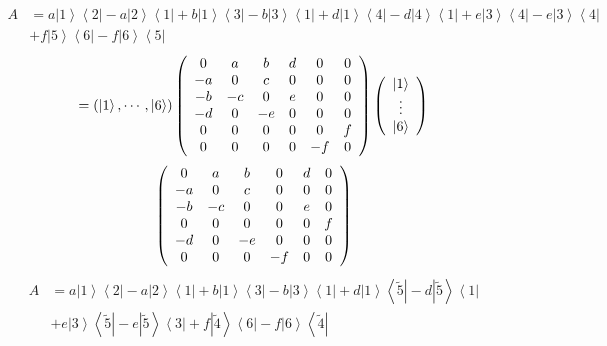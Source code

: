 \documentclass[aps,preprint]{revtex4}%
\begin{document}
\begin{align}
A  &  =a\left\vert 1\right\rangle \left\langle 2\right\vert -a\left\vert
2\right\rangle \left\langle 1\right\vert +b\left\vert 1\right\rangle
\left\langle 3\right\vert -b\left\vert 3\right\rangle \left\langle
1\right\vert +d\left\vert 1\right\rangle \left\langle 4\right\vert
-d\left\vert 4\right\rangle \left\langle 1\right\vert +e\left\vert
3\right\rangle \left\langle 4\right\vert -e\left\vert 3\right\rangle
\left\langle 4\right\vert \\
&  +f\left\vert 5\right\rangle \left\langle 6\right\vert -f\left\vert
6\right\rangle \left\langle 5\right\vert
\end{align}%
\begin{equation}
=\left(  \left\vert 1\right\rangle ,\cdots,\left\vert 6\right\rangle \right)
\left(
\begin{array}
[c]{cccccc}%
0 & a & b & d & 0 & 0\\
-a & 0 & c & 0 & 0 & 0\\
-b & -c & 0 & e & 0 & 0\\
-d & 0 & -e & 0 & 0 & 0\\
0 & 0 & 0 & 0 & 0 & f\\
0 & 0 & 0 & 0 & -f & 0
\end{array}
\right)  \left(
\begin{array}
[c]{c}%
\left\vert 1\right\rangle \\
\vdots\\
\left\vert 6\right\rangle
\end{array}
\right)
\end{equation}%
\begin{equation}
\left(
\begin{array}
[c]{cccccc}%
0 & a & b & 0 & d & 0\\
-a & 0 & c & 0 & 0 & 0\\
-b & -c & 0 & 0 & e & 0\\
0 & 0 & 0 & 0 & 0 & f\\
-d & 0 & -e & 0 & 0 & 0\\
0 & 0 & 0 & -f & 0 & 0
\end{array}
\right)
\end{equation}%
\begin{align}
A  &  =a\left\vert 1\right\rangle \left\langle 2\right\vert -a\left\vert
2\right\rangle \left\langle 1\right\vert +b\left\vert 1\right\rangle
\left\langle 3\right\vert -b\left\vert 3\right\rangle \left\langle
1\right\vert +d\left\vert 1\right\rangle \left\langle \tilde{5}\right\vert
-d\left\vert \tilde{5}\right\rangle \left\langle 1\right\vert \\
&  +e\left\vert 3\right\rangle \left\langle \tilde{5}\right\vert -e\left\vert
\tilde{5}\right\rangle \left\langle 3\right\vert +f\left\vert \tilde
{4}\right\rangle \left\langle 6\right\vert -f\left\vert 6\right\rangle
\left\langle \tilde{4}\right\vert
\end{align}%
\end{document}
